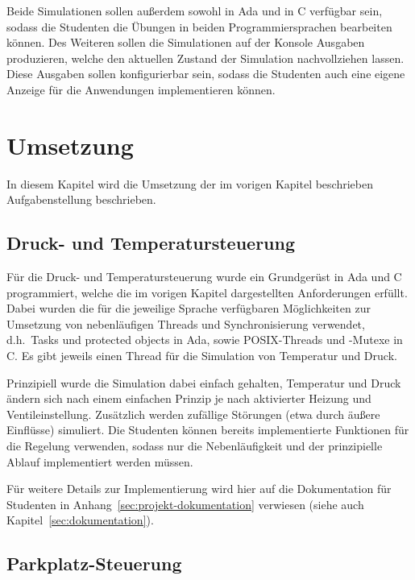 \documentclass[oneside]{elaboration}
\begin{document}
Beide Simulationen sollen außerdem sowohl in Ada und in C verfügbar sein, sodass
die Studenten die Übungen in beiden Programmiersprachen bearbeiten können.
Des Weiteren sollen die Simulationen auf der Konsole Ausgaben produzieren,
welche den aktuellen Zustand der Simulation nachvollziehen lassen. Diese
Ausgaben sollen konfigurierbar sein, sodass die Studenten auch eine eigene
Anzeige für die Anwendungen implementieren können.

\chapter{Umsetzung}
\label{chp:umsetzung}

In diesem Kapitel wird die Umsetzung der im vorigen Kapitel beschrieben
Aufgabenstellung beschrieben.

\section{Druck- und Temperatursteuerung}
\label{sec:druck-_und_temperatursteuerung}

Für die Druck- und Temperatursteuerung wurde ein Grundgerüst in Ada und C
programmiert, welche die im vorigen Kapitel dargestellten Anforderungen erfüllt.
Dabei wurden die für die jeweilige Sprache verfügbaren Möglichkeiten zur
Umsetzung von nebenläufigen Threads und Synchronisierung verwendet, d.h.\ Tasks
und protected objects in Ada, sowie POSIX-Threads und -Mutexe in C. Es gibt
jeweils einen Thread für die Simulation von Temperatur und Druck.

Prinzipiell wurde die Simulation dabei einfach gehalten, Temperatur und Druck
ändern sich nach einem einfachen Prinzip je nach aktivierter Heizung und
Ventileinstellung. Zusätzlich werden zufällige Störungen (etwa durch äußere
Einflüsse) simuliert. Die Studenten können bereits implementierte Funktionen für
die Regelung verwenden, sodass nur die Nebenläufigkeit und der prinzipielle
Ablauf implementiert werden müssen.

Für weitere Details zur Implementierung wird hier auf die Dokumentation für
Studenten in Anhang~\ref{sec:projekt-dokumentation} verwiesen (siehe auch
Kapitel~\ref{sec:dokumentation}).

\section{Parkplatz-Steuerung}
\label{sec:parkplatz-steuerung}
\end{document}
